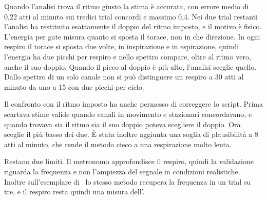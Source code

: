 Quando l'analisi trova il ritmo giusto la stima è accurata, con errore medio di 0,22 atti al minuto sui tredici trial concordi e massimo 0,4. Nei due trial restanti l'analisi ha restituito esattamente il doppio del ritmo imposto, e il motivo è fisico. L'energia per gate misura quanto si sposta il torace, non in che direzione. In ogni respiro il torace si sposta due volte, in inspirazione e in espirazione, quindi l'energia ha due picchi per respiro e nello spettro compare, oltre al ritmo vero, anche il suo doppio. Quando il picco al doppio è più alto, l'analisi sceglie quello. Dallo spettro di un solo canale non si può distinguere un respiro a 30 atti al minuto da uno a 15 con due picchi per ciclo.

Il confronto con il ritmo imposto ha anche permesso di correggere lo script. Prima scartava stime valide quando canali in movimento e stazionari concordavano, e quando trovava sia il ritmo sia il suo doppio poteva scegliere il doppio. Ora sceglie il più basso dei due. È stata inoltre aggiunta una soglia di plausibilità a 8 atti al minuto, che rende il metodo cieco a una respirazione molto lenta.

Restano due limiti. Il metronomo approfondisce il respiro, quindi la validazione riguarda la frequenza e non l'ampiezza del segnale in condizioni realistiche. Inoltre sull'esemplare di \ldc\ lo stesso metodo recupera la frequenza in un trial su tre, e il respiro resta quindi una misura dell'\ldb.
